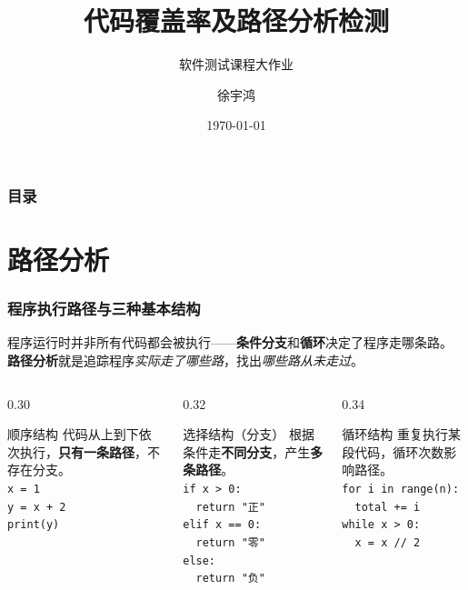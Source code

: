 \documentclass[presentation,aspectratio=169]{ctexbeamer}
\title{代码覆盖率及路径分析检测}
\subtitle{软件测试课程大作业}
\author{徐宇鸿}
\institute
{
计算机科学与工程学院 \\ %
\medskip
}
\date{\today}
\begin{document}
\begin{frame}
\titlepage
\end{frame}

\begin{frame}
\frametitle{目录}
\tableofcontents
\end{frame}


\section{路径分析}

\begin{frame}[fragile]
\frametitle{程序执行路径与三种基本结构}
{\small 程序运行时并非所有代码都会被执行——\textbf{条件分支}和\textbf{循环}决定了程序走哪条路。%
\textbf{路径分析}就是追踪程序\emph{实际走了哪些路}，找出\emph{哪些路从未走过}。}

\vspace{0.15cm}
\begin{columns}[T]
\begin{column}{0.30\textwidth}
\begin{block}{\small 顺序结构}
{\scriptsize
代码从上到下依次执行，\textbf{只有一条路径}，不存在分支。\\[2pt]
\texttt{x = 1}\\
\texttt{y = x + 2}\\
\texttt{print(y)}}
\end{block}
\end{column}
\begin{column}{0.32\textwidth}
\begin{block}{\small 选择结构（分支）}
{\scriptsize
根据条件走\textbf{不同分支}，产生\textbf{多条路径}。\\[2pt]
\texttt{if x > 0:}\\
\texttt{~~return "正"}\\
\texttt{elif x == 0:}\\
\texttt{~~return "零"}\\
\texttt{else:}\\
\texttt{~~return "负"}}
\end{block}
\end{column}
\begin{column}{0.34\textwidth}
\begin{block}{\small 循环结构}
{\scriptsize
重复执行某段代码，循环次数影响路径。\\[2pt]
\texttt{for i in range(n):}\\
\texttt{~~total += i}\\[3pt]
\texttt{while x > 0:}\\
\texttt{~~x = x // 2}}
\end{block}
\end{column}
\end{columns}


\end{frame}
\end{document}
